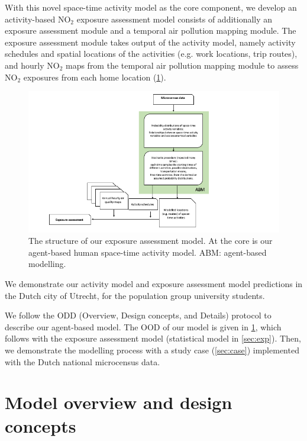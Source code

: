 \documentclass[]{article}
\begin{document}
With this novel space-time activity model as the core component, we develop an activity-based NO$_2$ exposure assessment model consists of additionally an exposure assessment module and a temporal air pollution mapping module. The exposure assessment module takes output of the activity model, namely activity schedules and spatial locations of the activities (e.g. work locations, trip routes), and hourly NO$_2$ maps from the temporal air pollution mapping module to assess NO$_2$ exposures from each home location (\cref{fig:expflow}).     

\begin{figure}
    \centering
    \includegraphics[width=\linewidth]{figure/exposureflow.png}
    \caption{The structure of our exposure assessment model. At the core is our agent-based human space-time activity model. ABM: agent-based modelling. }
    \label{fig:expflow}
\end{figure}
We demonstrate our activity model and exposure assessment model predictions in the Dutch city of Utrecht, for the population group university students.  

We follow the ODD (Overview, Design concepts, and Details) protocol \citep[][page 37,]{railsback2019agent} to describe our agent-based model. The OOD of our model is given in \cref{sec:model}, which follows with the exposure assessment model (statistical model in \cref{sec:exp}). Then, we demonstrate the modelling process with a study case (\cref{sec:case}) implemented with the Dutch national microcensus data. %


\section{Model overview and design concepts }
\label{sec:model}
\end{document}
